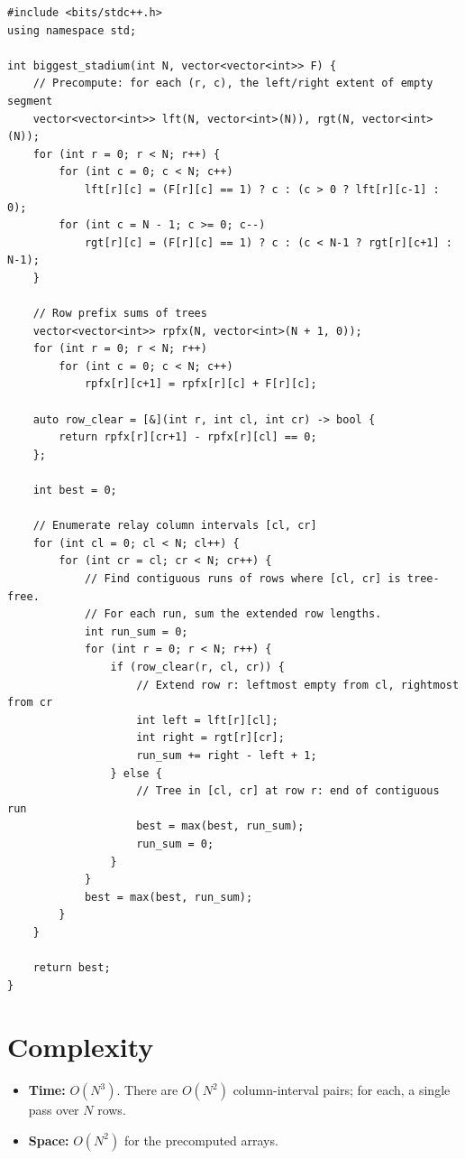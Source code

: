 \documentclass[11pt,a4paper]{article}
\begin{document}
\begin{lstlisting}
#include <bits/stdc++.h>
using namespace std;

int biggest_stadium(int N, vector<vector<int>> F) {
    // Precompute: for each (r, c), the left/right extent of empty segment
    vector<vector<int>> lft(N, vector<int>(N)), rgt(N, vector<int>(N));
    for (int r = 0; r < N; r++) {
        for (int c = 0; c < N; c++)
            lft[r][c] = (F[r][c] == 1) ? c : (c > 0 ? lft[r][c-1] : 0);
        for (int c = N - 1; c >= 0; c--)
            rgt[r][c] = (F[r][c] == 1) ? c : (c < N-1 ? rgt[r][c+1] : N-1);
    }

    // Row prefix sums of trees
    vector<vector<int>> rpfx(N, vector<int>(N + 1, 0));
    for (int r = 0; r < N; r++)
        for (int c = 0; c < N; c++)
            rpfx[r][c+1] = rpfx[r][c] + F[r][c];

    auto row_clear = [&](int r, int cl, int cr) -> bool {
        return rpfx[r][cr+1] - rpfx[r][cl] == 0;
    };

    int best = 0;

    // Enumerate relay column intervals [cl, cr]
    for (int cl = 0; cl < N; cl++) {
        for (int cr = cl; cr < N; cr++) {
            // Find contiguous runs of rows where [cl, cr] is tree-free.
            // For each run, sum the extended row lengths.
            int run_sum = 0;
            for (int r = 0; r < N; r++) {
                if (row_clear(r, cl, cr)) {
                    // Extend row r: leftmost empty from cl, rightmost from cr
                    int left = lft[r][cl];
                    int right = rgt[r][cr];
                    run_sum += right - left + 1;
                } else {
                    // Tree in [cl, cr] at row r: end of contiguous run
                    best = max(best, run_sum);
                    run_sum = 0;
                }
            }
            best = max(best, run_sum);
        }
    }

    return best;
}
\end{lstlisting}

\section{Complexity}

\begin{itemize}
  \item \textbf{Time:} $O(N^3)$.  There are $O(N^2)$ column-interval
        pairs; for each, a single pass over $N$ rows.
  \item \textbf{Space:} $O(N^2)$ for the precomputed arrays.
\end{itemize}
\end{document}

